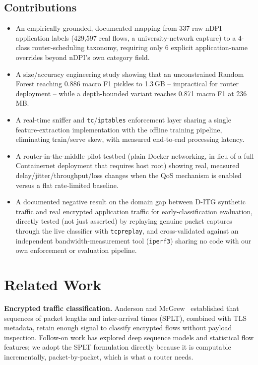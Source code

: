 \documentclass[10pt,twocolumn]{article}
\begin{document}
\subsection*{Contributions}
\begin{itemize}
  \item An empirically grounded, documented mapping from 337 raw nDPI
  application labels (429{,}597 real flows, a university-network capture)
  to a 4-class router-scheduling taxonomy, requiring only 6 explicit
  application-name overrides beyond nDPI's own category field.
  \item A size/accuracy engineering study showing that an unconstrained
  Random Forest reaching 0.886 macro F1 pickles to 1.3\,GB -- impractical
  for router deployment -- while a depth-bounded variant reaches 0.871
  macro F1 at 236\,MB.
  \item A real-time sniffer and \texttt{tc}/\texttt{iptables} enforcement
  layer sharing a single feature-extraction implementation with the
  offline training pipeline, eliminating train/serve skew, with measured
  end-to-end processing latency.
  \item A router-in-the-middle pilot testbed (plain Docker networking, in
  lieu of a full Containernet deployment that requires host root) showing
  real, measured delay/jitter/throughput/loss changes when the QoS
  mechanism is enabled versus a flat rate-limited baseline.
  \item A documented negative result on the domain gap between D-ITG
  synthetic traffic and real encrypted application traffic for
  early-classification evaluation, directly tested (not just asserted) by
  replaying genuine packet captures through the live classifier with
  \texttt{tcpreplay}, and cross-validated against an independent
  bandwidth-measurement tool (\texttt{iperf3}) sharing no code with our
  own enforcement or evaluation pipeline.
\end{itemize}

\section{Related Work}

\textbf{Encrypted traffic classification.} Anderson and
McGrew~\cite{anderson2017deciphering} established that sequences of
packet lengths and inter-arrival times (SPLT), combined with TLS metadata,
retain enough signal to classify encrypted flows without payload
inspection. Follow-on work has explored deep sequence models and
statistical flow features; we adopt the SPLT formulation directly because
it is computable incrementally, packet-by-packet, which is what a router
needs.
\end{document}
